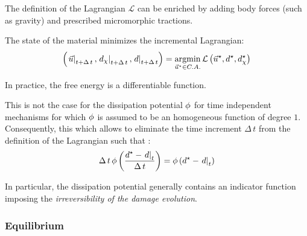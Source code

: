 The definition of the Lagrangian \(\mathcal{L}\) can be enriched by adding
body forces (such as gravity) and prescribed micromorphic tractions.

The state of the material minimizes the incremental Lagrangian:
\begin{equation}
  \label{eq:ef_micromorphic:formulation:total_lagrangian_min}
  \left(\left.\vec{u}\right|_{t+\Delta\,t}, \left.d_{\chi}\right|_{t+\Delta\,t}, \left.d\right|_{t+\Delta\,t}\right) = \underset{\vec{u}^{\star}\in C.A.}{\mathrm{argmin}}\, \mathcal{L}\left(\vec{u}^{\star},d^{\star},d_{\chi}^{\star}\right)
\end{equation}

In practice, the free energy is a differentiable function.

This is not the case for the dissipation potential
\(\phi\) for time independent mechanisms for which
\(\phi\) is assumed to be an homogeneous function of
degree \(1\). Consequently, this which allows to eliminate the time increment
\(\Delta\,t\) from the definition of the Lagrangian such that :
\begin{equation}
  \label{eq:ef_micromorphic:formulation:dissipation}
  \Delta\,t\,\phi\left(\displaystyle \frac{\displaystyle d^{\star}-\left.d\right|_{t}}{\displaystyle \Delta\,t}\right) = \phi\left(d^{\star}-\left.d\right|_{t}\right)
\end{equation}

In particular, the dissipation potential generally contains an indicator
function imposing the \textit{irreversibility of the damage evolution}.

\subsubsection{Equilibrium}


